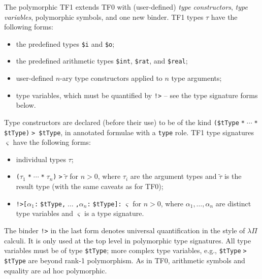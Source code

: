 \documentclass{easychair}
\begin{document}
The polymorphic TF1 extends TF0 with (user-defined) {\em type constructors}, 
{\em type variables}, polymorphic symbols, and one new binder.
TF1 types $\tau$ have the following forms:
\begin{itemize}
\item the predefined types {\tt \$i} and {\tt \$o};
\item the predefined arithmetic types {\tt \$int}, {\tt \$rat}, and 
      {\tt \$real};
\item user-defined $n$-ary type constructors applied to $n$ type arguments;
\item type variables, which must be quantified by {\tt !>} -- see the type
      signature forms below.
\end{itemize}
Type constructors are declared (before their use) to be of the kind
{\tt (\$tType$\;$*$\;{\cdots}\;$*$\;$\$tType)$\;$> \$tType}, in annotated 
formulae with a {\tt type} role.
TF1 type signatures $\varsigma$ have the following forms:
\begin{itemize}
\item individual types $\tau$;
\item {\tt ($\tau_1\;$*$\;{\cdots}\;$*$\;\tau_n$)$\;$>$\;\tilde \tau$}
      for $n > 0$, where $\tau_i$ are the argument types and $\tilde \tau$
      is the result type (with the same caveats as for TF0);
\item {\tt !>[$\alpha_1$:$\;$\$tType,$\;{\dots}\;$,$\alpha_n$:$\;$\$tType]:$\;\varsigma$}
      for $n > 0$, where $\alpha_1,\dots,\alpha_n$ are distinct
      type variables and $\varsigma$ is a type signature.
\end{itemize}
The binder {\tt !>} in the last form denotes universal quantification in the
style of $\lambda\Pi$ calculi.
It is only used at the top level in polymorphic type signatures.
All type variables must be of type {\tt \$tType}; more complex type variables,
e.g., {\tt \$tType$\;$>$\;$\$tType} are beyond rank-1 polymorphism.
As in TF0, arithmetic symbols and equality are ad hoc polymorphic.
\end{document}
